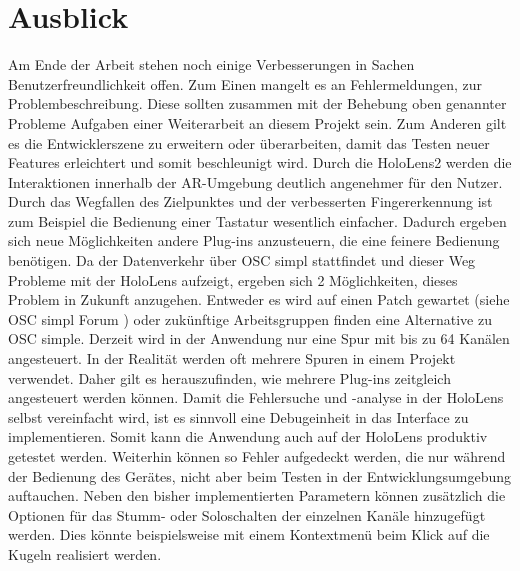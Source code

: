 \documentclass[11pt, titlepage, fleqn]{report}
\begin{document}
        \section{Ausblick}
        \label{sec:4.3}
        	Am Ende der Arbeit stehen noch einige Verbesserungen in Sachen 
        	Benutzerfreundlichkeit offen. Zum Einen mangelt es an 
        	Fehlermeldungen, zur Problembeschreibung. Diese sollten zusammen 
        	mit der Behebung oben genannter Probleme Aufgaben einer 
        	Weiterarbeit an diesem Projekt sein. Zum Anderen gilt es die 
        	Entwicklerszene zu erweitern oder überarbeiten, damit das 
        	Testen neuer Features erleichtert und somit beschleunigt 
        	wird.\newline
        	Durch die HoloLens2 werden die Interaktionen innerhalb der 
        	AR-Umgebung deutlich angenehmer für den Nutzer. Durch das Wegfallen 
        	des Zielpunktes und der verbesserten Fingererkennung ist zum 
        	Beispiel die Bedienung einer Tastatur wesentlich einfacher. Dadurch 
        	ergeben sich neue Möglichkeiten andere Plug-ins anzusteuern, die 
        	eine feinere Bedienung benötigen.\newline
        	Da der Datenverkehr über OSC simpl stattfindet und dieser Weg 
        	Probleme mit der HoloLens aufzeigt, ergeben sich 2 Möglichkeiten, 
        	dieses Problem in Zukunft anzugehen. Entweder es wird auf einen 
        	Patch gewartet (siehe OSC simpl Forum \cite{OscSimpl87}) oder 
        	zukünftige Arbeitsgruppen finden eine Alternative zu OSC 
        	simple.\newline
        	Derzeit wird in der Anwendung nur eine Spur mit bis zu 64 Kanälen 
        	angesteuert. In der Realität werden oft mehrere Spuren in einem 
        	Projekt verwendet. Daher gilt es herauszufinden, wie mehrere 
        	Plug-ins zeitgleich angesteuert werden können.\newline
        	Damit die Fehlersuche und -analyse in der HoloLens selbst 
        	vereinfacht 
        	wird, ist es sinnvoll eine Debugeinheit in das Interface zu 
        	implementieren. Somit kann die Anwendung auch auf der HoloLens 
        	produktiv getestet werden. Weiterhin können so Fehler aufgedeckt 
        	werden, die nur während der Bedienung des Gerätes, nicht aber beim 
        	Testen in der Entwicklungsumgebung auftauchen.\newline
        	Neben den bisher implementierten Parametern können zusätzlich die 
        	Optionen für das Stumm- oder Soloschalten der einzelnen Kanäle 
        	hinzugefügt werden. Dies könnte beispielsweise mit einem 
        	Kontextmenü beim Klick auf die Kugeln 
        	realisiert werden.\newpage
            
  \printbibliography       
\end{document}
